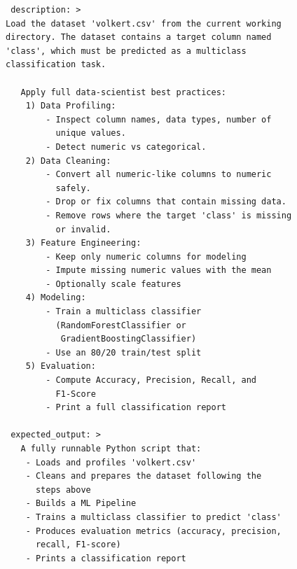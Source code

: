 \begin{tcolorbox}[ left=2pt,   right=2pt,   top=2pt,   bottom=2pt, colback=gray!5,colframe=black!40,title={Expertise instruction prompt}]
\scriptsize
\setlength{\baselineskip}{0.6\baselineskip} \begin{verbatim}
 description: >
Load the dataset 'volkert.csv' from the current working 
directory. The dataset contains a target column named 
'class', which must be predicted as a multiclass 
classification task.

   Apply full data-scientist best practices:
    1) Data Profiling:
        - Inspect column names, data types, number of 
          unique values.
        - Detect numeric vs categorical.
    2) Data Cleaning:
        - Convert all numeric-like columns to numeric 
          safely.
        - Drop or fix columns that contain missing data.
        - Remove rows where the target 'class' is missing 
          or invalid.
    3) Feature Engineering:
        - Keep only numeric columns for modeling
        - Impute missing numeric values with the mean
        - Optionally scale features
    4) Modeling:
        - Train a multiclass classifier 
          (RandomForestClassifier or 
           GradientBoostingClassifier)
        - Use an 80/20 train/test split
    5) Evaluation:
        - Compute Accuracy, Precision, Recall, and 
          F1-Score
        - Print a full classification report

 expected_output: >
   A fully runnable Python script that:
    - Loads and profiles 'volkert.csv'
    - Cleans and prepares the dataset following the 
      steps above
    - Builds a ML Pipeline
    - Trains a multiclass classifier to predict 'class'
    - Produces evaluation metrics (accuracy, precision, 
      recall, F1-score)
    - Prints a classification report
\end{verbatim}
\end{tcolorbox}


































